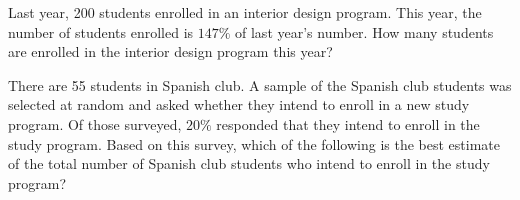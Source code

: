 \question[1]
Last year, 200 students enrolled in an interior design program. This year, the number of students enrolled is $147\%$ of last year's number. How many students are enrolled in the interior design program this year?
\begin{choices}
\end{choices}



\question[1]
There are 55 students in Spanish club. A sample of the Spanish club students was selected at random and asked whether they intend to enroll in a new study program. Of those surveyed, $20\%$ responded that they intend to enroll in the study program. Based on this survey, which of the following is the best estimate of the total number of Spanish club students who intend to enroll in the study program?
\begin{choices}
\end{choices}






\newpage

